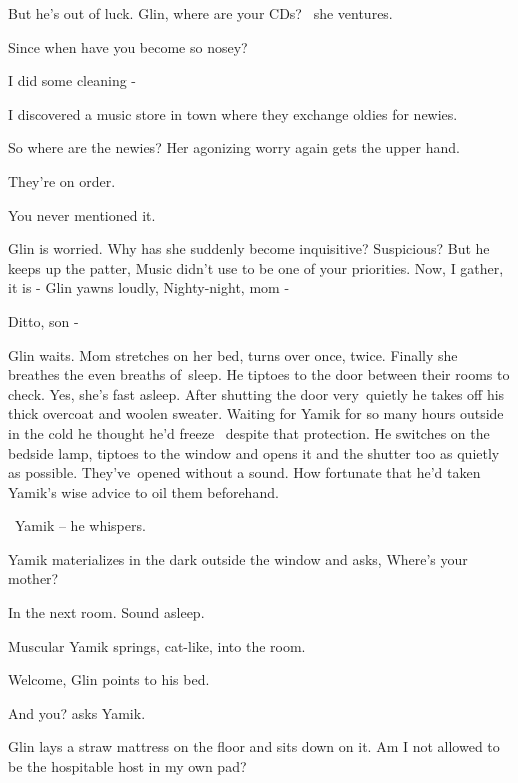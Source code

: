 \documentclass[12pt]{book}
\begin{document}
But he's out of luck. {\textquotedbl}Glin, where are your CDs?{\textquotedbl} \ she ventures.

{\textquotedbl}Since when have you become so nosey?{\textquotedbl}

{\textquotedbl}I did some cleaning -{\textquotedbl}

{\textquotedbl}I discovered a music store in town where they exchange oldies for newies.{\textquotedbl}

{\textquotedbl}So where are the newies?{\textquotedbl} Her agonizing worry again gets the upper hand.

{\textquotedbl}They're on order.{\textquotedbl}

{\textquotedbl}You never mentioned it.{\textquotedbl}

Glin is worried. Why has she suddenly become inquisitive? Suspicious? But he keeps up the patter, {\textquotedbl}Music
didn't use to be one of your priorities. Now, I gather, it is -{\textquotedbl} Glin yawns
loudly{,} {\textquotedbl}Nighty-night, mom -{\textquotedbl}

{\textquotedbl}Ditto, son -{\textquotedbl}

Glin waits. Mom stretches on her bed, turns over once, twice. Finally she breathes the even breaths of~sleep. He tiptoes
to the door between their rooms to check. Yes, she's fast asleep. After shutting the door very~quietly he takes off his
thick overcoat and woolen sweater. Waiting for Yamik for so many hours outside in the cold he thought he'd freeze
\ despite that protection. He switches on the bedside lamp, tiptoes to the window and opens it and the shutter too as
quietly as possible. They've~opened without a sound. How fortunate that
h{e}{}'d taken{ }Yamik's wise advice to
oil them beforehand.

\ {\textquotedbl}Yamik --{\textquotedbl} he whispers.

Yamik materializes in the dark outside the window and asks, {\textquotedbl}Where's your mother?{\textquotedbl}

{\textquotedbl}In the next room. Sound asleep.{\textquotedbl}

Muscular Yamik springs, cat-like, into the room.

{\textquotedbl}Welcome,{\textquotedbl} Glin points to his bed.

{\textquotedbl}And you?{\textquotedbl} asks Yamik.~

Glin lays a straw mattress on the floor and sits down on it. {\textquotedbl}Am I not allowed to be the hospitable host
in my own pad?{\textquotedbl}
\end{document}
